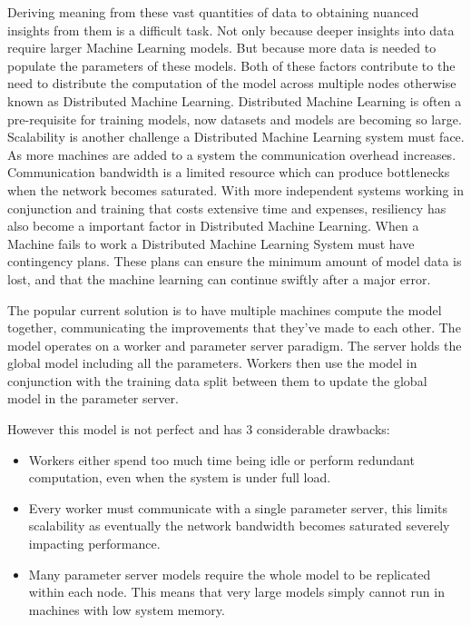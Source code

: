 Deriving meaning from these vast quantities of data to obtaining nuanced
insights from them is a difficult task. Not only because deeper insights into
data require larger Machine Learning models. But because more data is needed to
populate the parameters of these models. Both of these factors contribute to the
need to distribute the computation of the model across multiple nodes otherwise
known as Distributed Machine Learning. Distributed Machine Learning is often a
pre-requisite for training models, now datasets and models are becoming so
large. \cite{LI2014ParameterServers} Scalability is another challenge a
Distributed Machine Learning system must face. As more machines are added to a
system the communication overhead increases. Communication bandwidth is a
limited resource which can produce bottlenecks when the network becomes
saturated. With more independent systems working in conjunction and training
that costs extensive time and expenses, resiliency has also become a important
factor in Distributed Machine Learning. When a Machine fails to work a
Distributed Machine Learning System must have contingency plans. These plans can
ensure the minimum amount of model data is lost, and that the machine learning
can continue swiftly after a major error.
\par

The popular current solution is to have multiple machines compute the model
together, communicating the improvements that they've made to each other. The
model operates on a worker and parameter server paradigm. The server holds the
global model including all the parameters. Workers then use the model in
conjunction with the training data split between them to update the global model
in the parameter server. \cite{LI2014ParameterServers}
\par

However this model is not perfect and has 3 considerable drawbacks:
\begin{itemize}
    \item Workers either spend too much time being idle or perform redundant
    computation, even when the system is under full load.
    \cite{googlemapreduce2008}
    \item Every worker must communicate with a single parameter server, this
    limits scalability as eventually the network bandwidth becomes saturated
    severely impacting performance. \cite{LI2014ParameterServers}
    \item Many parameter server models require the whole model to be replicated
    within each node. \cite{jia2018BeyondData} This means that very large models
    simply cannot run in machines with low system memory.  
\end{itemize}


